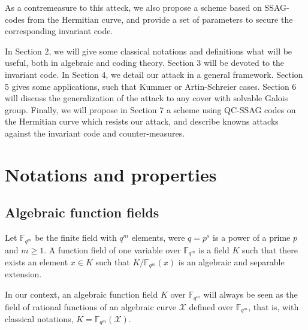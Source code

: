 \documentclass[10pt]{article}
\newcommand{\s}{\vspace{0.3cm}}
\newcommand{\fqm}{\mathbb{F}_{q^m}}
\newcommand{\X}{\mathcal{X}}
\begin{document}
\s

As a contremeasure to this atteck, we also propose a scheme based on SSAG-codes from the Hermitian curve, and provide a set of parameters to secure the corresponding invariant code.   

\s

In Section 2, we will give some classical notations and definitions what will be useful, both in algebraic and coding theory. Section 3 will be devoted to the invariant code. In Section 4, we detail our attack in a general framework. Section 5 gives some applications, such that Kummer or Artin-Schreier cases. Section 6 will discuss the generalization of the attack to any cover with solvable Galois group. Finally, we will propose in Section 7 a scheme using QC-SSAG codes on the Hermitian curve which resists our attack, and describe knowns attacks against the invariant code and counter-measures.


\s

\section{Notations and properties}

\s

\subsection{Algebraic function fields}

\s


Let $\fqm$ be the finite field with $q^m$ elements, were $q=p^s$ is a power of a prime $p$ and $m \geq 1$. A function field of one variable over $\fqm$ is a field $K$ such that there exists an element $x\in K$ such that $K/\fqm(x)$ is an algebraic and separable extension. 

In our context, an algebraic function field $K$ over $\fqm$ will always be seen as the field of rational functions of an algebraic curve $\X$ defined over $\fqm$, that is, with classical notations, $K = \fqm(\X)$.
\end{document}
